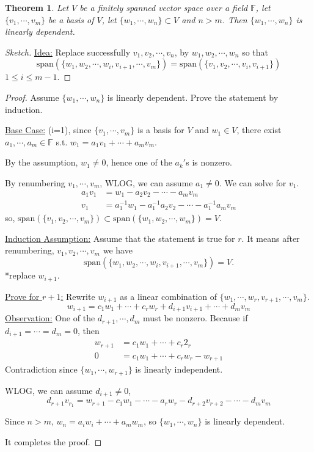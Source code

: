 \documentclass[12pt]{article}
\theoremstyle{plain}
\newtheorem{theorem}{Theorem}[subsection]
\newcommand{\Span}{\mathrm{span}}
\newcommand{\mF}{{\mathbb{F}}}
\begin{document}
	\begin{theorem}
		Let $V$ be a finitely spanned vector space over a field $\mF$, let 
		$\{v_1, \cdots, v_m\}$ be a basis of $V$, let $\{w_1, \cdots, w_n\}
		\subset V$ and $n > m$. Then $\{w_1, \cdots, w_n\}$ is linearly 
		dependent. 
	\end{theorem}
	\begin{proof}[Sketch]
		\underline{Idea:} 
		Replace successfully $v_1, v_2, \cdots,v_n$, by $w_1, w_2,\cdots,w_n$
		so that 
		\[
			\Span(\{w_1, w_2, \cdots, w_i, v_{i+1}, \cdots, v_m\})
			= \Span(\{v_1, v_2,\cdots,v_i, v_{i+1}\})
		\]
		$1\leq i\leq m-1$. 
	\end{proof}
	\begin{proof}
		Assume $\{w_1, \cdots, w_n\}$ is linearly dependent. Prove the 
		statement by induction. 

		\underline{Base Case:} (i=1), since $\{v_1, \cdots, v_m\}$ is a basis
		 for $V$ and $w_1 \in V$, there exist $a_1, \cdots, a_m \in \mF$ s.t.
		 $w_1 = a_1v_1+\cdots+a_mv_m$. 

		 By the assumption, $w_1 \neq 0$, hence one of the $a_k'$s is nonzero. 

		 By renumbering $v_1, \cdots, v_m$, WLOG, we can assume $a_1\neq 0$. 
		 We can solve for $v_1$. 
		\begin{align*}
			 a_1v_1 &= w_1 - a_2v_2 - \cdots - a_mv_m \\
			 v_1 &= a_1^{-1}w_1 - a_1^{-1}a_2v_2-\cdots-a_1^{-1}a_mv_m
		\end{align*}
		so, $\Span(\{v_1, v_2,\cdots, v_m\}) \subset \Span(\{w_1, w_2,
		\cdots, w_m\}) = V$. 

		\underline{Induction Assumption:}
		Assume that the statement is true for $r$. It means after renumbering, 
		$v_1,v_2,\cdots,v_m$ we have 
		\[
			 \Span(\{w_1, w_2, \cdots, w_i, v_{i+1}, \cdots, v_m\})
			 = V. 
		\]
		*replace $w_{i+1}$. 

		\underline{Prove for $r+1$:} 
		Rewrite $w_{i+1}$ as a linear combination of $\{w_1, \cdots, w_r,
		v_{r+1}, \cdots, v_m\}$. 
		\[
			 w_{i+1} = c_1w_1 + \cdots + c_rw_r + d_{i+1}v_{i+1} + \cdots
			 + d_mv_m
		\]
		\underline{Observation:} One of the $d_{r+1}, \cdots, d_m$ must be 
		nonzero. Because if $d_{i+1} = \cdots = d_m = 0$, then 
		\begin{align*}
			w_{r+1} &= c_1w_1 + \cdots + c_r2_r\\
			0&= c_1w_1 + \cdots + c_r w_r - w_{r+1}
		\end{align*}
		Contradiction since $\{w_1, \cdots, w_{r+1}\}$ is linearly independent.
		
		WLOG, we can assume $d_{i+1} \neq 0$,
		\[
			d_{r+1} v_{r_1} = w_{r+1} - c_1w_1-\cdots-a_rw_r-d_{r+2}v_{r+2}
			-\cdots-d_mv_m
		\]
		

		Since $n>m$, $w_n = a_iw_i + \cdots + a_mw_m$, so $\{w_1, \cdots, w_n\}$
		 is linearly dependent. 
		
		It completes the proof. 
	\end{proof}
\end{document}

